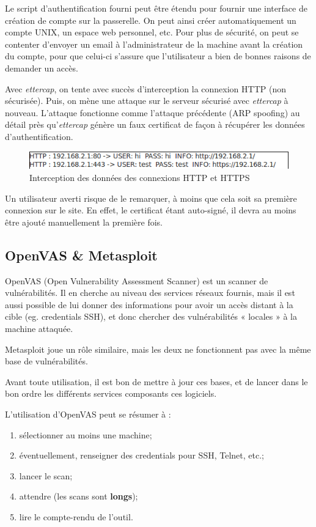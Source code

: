 \documentclass[a4paper]{article}
\begin{document}
Le script d'authentification fourni peut être étendu pour
fournir une interface de création de compte sur la passerelle.
On peut ainsi créer automatiquement un compte UNIX, un espace
web personnel, etc. Pour plus de sécurité, on peut se contenter
d'envoyer un email à l'administrateur de la machine avant la
création du compte, pour que celui-ci s'assure que l'utilisateur
a bien de bonnes raisons de demander un accès.

Avec \textit{ettercap}, on tente avec succès d'interception la connexion HTTP
(non sécurisée). Puis, on mène une attaque sur le serveur sécurisé avec
\textit{ettercap} à nouveau. L'attaque fonctionne comme l'attaque précédente
(ARP spoofing) au détail près qu'\textit{ettercap} génère un faux certificat de façon
à récupérer les données d'authentification.

\begin{figure}[!ht]
	\centering
	\includegraphics[scale=.6]{HTTPHTTPS.png}
	\caption{\label{attaques} Interception des données des connexions HTTP et HTTPS}
\end{figure}

Un utilisateur averti risque de le remarquer, à moins que cela
soit sa première connexion sur le site. En effet, le certificat
étant auto-signé, il devra au moins être ajouté manuellement
la première fois.

\subsection{OpenVAS \& Metasploit}
OpenVAS (Open Vulnerability Assessment Scanner) est un scanner de vulnérabilités.
Il en cherche au niveau des services réseaux fournis, mais il est aussi possible
de lui donner des informations pour avoir un accès distant à la cible (eg. credentials
SSH), et donc chercher des vulnérabilités « locales » à la machine attaquée.

Metasploit joue un rôle similaire, mais les deux ne fonctionnent pas avec la même
base de vulnérabilités.

Avant toute utilisation, il est bon de mettre à jour ces bases, et de lancer
dans le bon ordre les différents services composants ces logiciels.

L'utilisation d'OpenVAS peut se résumer à :
\begin{enumerate}
	\item sélectionner au moins une machine;
	\item éventuellement, renseigner des credentials pour SSH, Telnet, etc.;
	\item lancer le scan;
	\item attendre (les scans sont \textbf{longs});
	\item lire le compte-rendu de l'outil.
\end{enumerate}
\end{document}
